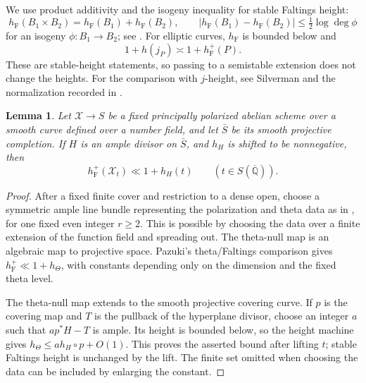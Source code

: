 \documentclass[11pt,a4paper]{article}
\numberwithin{equation}{section}
\newtheorem{lemma}[theorem]{Lemma}
\theoremstyle{definition}
\theoremstyle{remark}
\newcommand{\Qbar}{\overline{\mathbb Q}}
\newcommand{\hF}{h_{\mathrm F}}
\newcommand{\hFp}{h_{\mathrm F}^{+}}
\begin{document}
We use product additivity and the isogeny inequality for stable
Faltings height:
\begin{equation}\label{eq:faltings-isogeny}
 \hF(B_1\times B_2)=\hF(B_1)+\hF(B_2),\qquad
 |\hF(B_1)-\hF(B_2)|\le\tfrac12\log\deg\phi
\end{equation}
for an isogeny \(\phi:B_1\to B_2\); see \cite[\S2.3]{GR}.
For elliptic curves, \(\hF\) is bounded below and
\begin{equation}\label{eq:elliptic-height}
 1+h(j_P)\asymp 1+\hFp(P).
\end{equation}
These are stable-height statements, so passing to a semistable
extension does not change the heights. For the comparison with
\(j\)-height, see Silverman \cite[Proposition~2.1]{Silverman}
and the normalization recorded in \cite[Proposition~3.1]{Lobrich}.

\begin{lemma}\label{lem:family-height}
Let \(\mathcal X\to S\) be a fixed principally polarized abelian scheme
over a smooth curve defined over a number field, and let \(\bar S\)
be its smooth projective completion. If \(H\) is an ample divisor on
\(\bar S\), and \(h_H\) is shifted to be nonnegative, then
\[
 \hFp(\mathcal X_t)\ll 1+h_H(t)
 \qquad(t\in S(\Qbar)).
\]
\end{lemma}

\begin{proof}
After a fixed finite cover and restriction to a dense open, choose
a symmetric ample line bundle representing the polarization and
theta data as in \cite[\S2.3]{Pazuki}, for one fixed even integer
\(r\ge2\). This is possible by choosing the data over a finite
extension of the function field and spreading out. The theta-null map is an algebraic map to projective space.
Pazuki's theta/Faltings comparison
\cite[Theorem~1.1 and Corollary~1.3]{Pazuki} gives
\(\hFp\ll1+h_\Theta\), with constants depending only on the dimension
and the fixed theta level.

The theta-null map extends to the smooth projective covering curve.
If \(p\) is the covering map and \(T\) is the pullback of the
hyperplane divisor, choose an integer \(a\) such that
\(ap^*H-T\) is ample. Its height is bounded below, so the height
machine gives \(h_\Theta\le a h_H\circ p+O(1)\).
This proves the asserted bound after lifting \(t\); stable Faltings
height is unchanged by the lift. The finite set omitted when choosing the data can be included
by enlarging the constant.
\end{proof}
\end{document}
